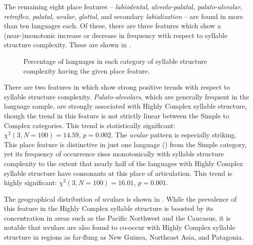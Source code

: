   The remaining eight place features -- \textit{labiodental}, \textit{alveolo-palatal, palato-alveo\-lar}, \textit{retroflex}, \textit{palatal}, \textit{uvular}, \textit{glottal}, and secondary \textit{labialization} -- are found in more than ten languages each. Of these, there are three features which show a \mbox{(near-)}\linebreak monotonic increase or decrease in frequency with respect to syllable structure complexity. These are shown in .

\begin{figure}
\caption{\label{fig:4.8}Percentage of languages in each category of syllable structure complexity having the given place feature.}
\end{figure}

  There are two features in  which show strong positive trends with respect to syllable structure complexity. \textit{Palato-alveolars}, which are generally frequent in the language sample, are strongly associated with Highly Complex syllable structure, though the trend in this feature is not strictly linear between the Simple to Complex categories. This trend is statistically significant: $\chi^2(3, N = 100) = 14.59$, $p = 0.002$. The \textit{uvular} pattern is especially striking. This place feature is distinctive in just one language () from the Simple category, yet its frequency of occurrence rises monotonically with syllable structure complexity to the extent that nearly half of the languages with Highly Complex syllable structure have consonants at this place of articulation. This trend is highly significant: $\chi^2(3, N = 100) = 16.01$, $p = 0.001$. 

  The geographical distribution of uvulars is shown in . While the prevalence of this feature in the Highly Complex syllable structure is boosted by its concentration in areas such as the Pacific Northwest and the Caucasus, it is notable that uvulars are also found to co-occur with Highly Complex syllable structure in regions as far-flung as New Guinea, Northeast Asia, and Patagonia.

